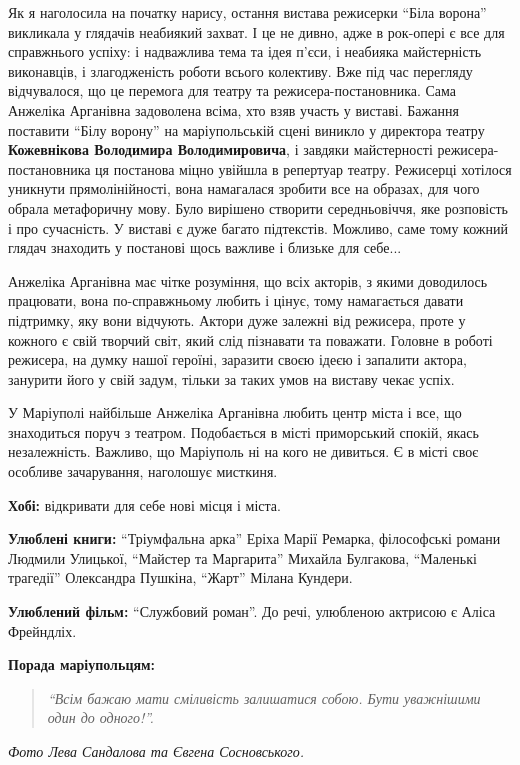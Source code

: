 
Як я наголосила на початку нарису, остання вистава режисерки \enquote{Біла ворона}
викликала у глядачів неабиякий захват. І це не дивно, адже в рок-опері є все
для справжнього успіху: і надважлива тема та ідея п'єси, і неабияка
майстерність виконавців, і злагодженість роботи всього колективу. Вже під час
перегляду відчувалося, що це перемога для театру та режисера-постановника. Сама
Анжеліка Арганівна задоволена всіма, хто взяв участь у виставі. Бажання
поставити \enquote{Білу ворону} на маріупольській сцені виникло у директора театру
\textbf{Кожевнікова Володимира Володимировича}, і завдяки майстерності
режисера-постановника ця постанова міцно увійшла в репертуар театру. Режисерці
хотілося уникнути прямолінійності, вона намагалася зробити все на образах, для
чого обрала метафоричну мову. Було вирішено створити середньовіччя, яке
розповість і про сучасність. У виставі є дуже багато підтекстів. Можливо, саме
тому кожний глядач знаходить у постанові щось важливе і близьке для себе...


Анжеліка Арганівна має чітке розуміння, що всіх акторів, з якими доводилось
працювати, вона по-справжньому любить і цінує, тому намагається давати
підтримку, яку вони відчують. Актори дуже залежні від режисера, проте у кожного
є свій творчий світ, який слід пізнавати та поважати. Головне в роботі
режисера, на думку нашої героїні, заразити своєю ідеєю і запалити актора,
занурити його у свій задум, тільки за таких умов на виставу чекає успіх. 


У Маріуполі найбільше Анжеліка Арганівна любить центр міста і все, що
знаходиться поруч з театром. Подобається в місті приморський спокій, якась
незалежність. Важливо, що Маріуполь ні на кого не дивиться. Є в місті своє
особливе зачарування, наголошує мисткиня.



\textbf{Хобі:} відкривати для себе нові місця і міста.

\textbf{Улюблені книги:} \enquote{Тріумфальна арка} Еріха Марії Ремарка, філософські романи Людмили Улицької, \enquote{Майстер та Маргарита} Михайла Булгакова, \enquote{Маленькі трагедії} Олександра Пушкіна, \enquote{Жарт} Мілана Кундери.

\textbf{Улюблений фільм:} \enquote{Службовий роман}. До речі, улюбленою актрисою є Аліса Фрейндліх.

\textbf{Порада маріупольцям:} 

\begin{quote}
\em\enquote{Всім бажаю мати сміливість залишатися собою. Бути уважнішими один до одного!}.
\end{quote}

\emph{Фото Лева Сандалова та Євгена Сосновського.}
